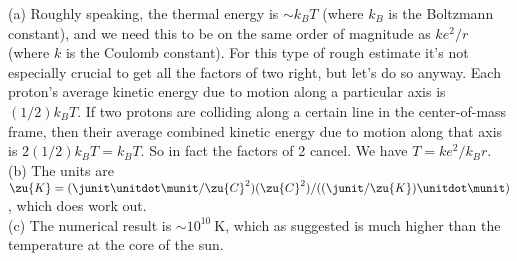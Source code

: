 (a) Roughly speaking, the thermal energy is $\sim k_BT$ (where $k_B$ is the Boltzmann constant),
and we need this to be on the same order of magnitude as $ke^2/r$ (where $k$ is the Coulomb constant).
For this type of rough estimate it's
not especially crucial to get all the factors of two right, but let's do so anyway. Each proton's average
kinetic energy due to motion along a particular axis is $(1/2)k_BT$. If two protons are colliding along a certain
line in the center-of-mass frame, then their average combined kinetic energy due to motion along that axis
is $2(1/2)k_BT=k_BT$. So in fact the factors of 2 cancel. We have $T=ke^2/k_Br$.\\
(b) The units are $\zu{K}=(\junit\unitdot\munit/\zu{C}^2)(\zu{C}^2)/((\junit/\zu{K})\unitdot\munit)$, which does
work out.\\
(c) The numerical result is $\sim 10^{10}\ \text{K}$, which as suggested is much higher than the temperature at the core
of the sun.
